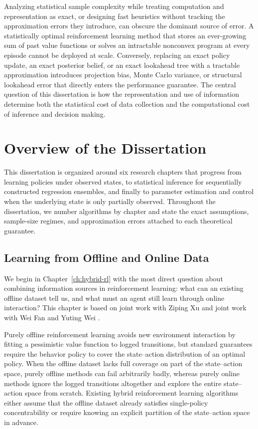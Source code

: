 \begin{aigenblock}
Analyzing statistical sample complexity while treating computation and representation as exact, or designing fast heuristics without tracking the approximation errors they introduce, can obscure the dominant source of error. A statistically optimal reinforcement learning method that stores an ever-growing sum of past value functions or solves an intractable nonconvex program at every episode cannot be deployed at scale. Conversely, replacing an exact policy update, an exact posterior belief, or an exact lookahead tree with a tractable approximation introduces projection bias, Monte Carlo variance, or structural lookahead error that directly enters the performance guarantee. The central question of this dissertation is how the representation and use of information determine both the statistical cost of data collection and the computational cost of inference and decision making.

\section{Overview of the Dissertation}

This dissertation is organized around six research chapters that progress from learning policies under observed states, to statistical inference for sequentially constructed regression ensembles, and finally to parameter estimation and control when the underlying state is only partially observed. Throughout the dissertation, we number algorithms by chapter and state the exact assumptions, sample-size regimes, and approximation errors attached to each theoretical guarantee.

\subsection{Learning from Offline and Online Data}

We begin in Chapter~\ref{ch:hybrid-rl} with the most direct question about combining information sources in reinforcement learning: what can an existing offline dataset tell us, and what must an agent still learn through online interaction? This chapter is based on joint work with Ziping Xu \citep{tan2024natural} and joint work with Wei Fan and Yuting Wei \citep{tan2024hybrid}.

Purely offline reinforcement learning avoids new environment interaction by fitting a pessimistic value function to logged transitions, but standard guarantees require the behavior policy to cover the state--action distribution of an optimal policy. When the offline dataset lacks full coverage on part of the state--action space, purely offline methods can fail arbitrarily badly, whereas purely online methods ignore the logged transitions altogether and explore the entire state--action space from scratch. Existing hybrid reinforcement learning algorithms either assume that the offline dataset already satisfies single-policy concentrability or require knowing an explicit partition of the state--action space in advance.


\end{aigenblock}
